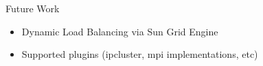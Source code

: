 \begin{frame}{Future Work}
\begin{itemize}
\item Dynamic Load Balancing via Sun Grid Engine 
\item Supported plugins (ipcluster, mpi implementations, etc)
\end{itemize}
\end{frame}
